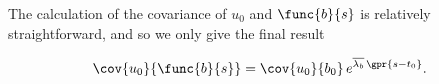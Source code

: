 The calculation of the covariance of $u_0$ and $\func{b}{s}$ is relatively straightforward, and so we only give the final result

\begin{equation}
    \cov{u_0}{\func{b}{s}} = \cov{u_0}{b_0}\,e^{\overline{\lambda_{b}}\,\gpr{s - t_0}}. \label{eqn:cov_u0_bs}
\end{equation}